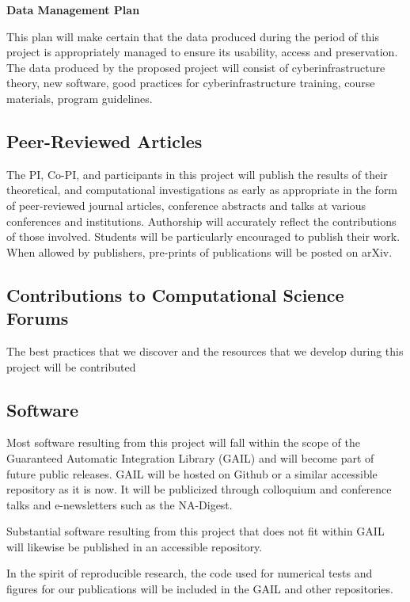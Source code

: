 \documentclass[11pt]{NSFamsart}
\begin{document}

\centerline{\textbf{\Large Data Management Plan}}

\bigskip



This plan will make certain that the data produced during the period of this project is appropriately managed to ensure its usability, access and preservation.  The data produced by the proposed project will consist of cyberinfrastructure theory, new software, good practices for cyberinfrastructure training, course materials, program guidelines. 

\subsection*{Peer-Reviewed Articles}  The PI, Co-PI, and participants in this project will publish the results of their theoretical, and computational investigations as early as appropriate in the form of peer-reviewed journal articles, conference abstracts and talks at various conferences and institutions. Authorship will accurately 
reflect the contributions of those involved.  Students will be particularly encouraged to publish their work. When allowed by publishers, pre-prints of publications will be posted on arXiv.

\subsection*{Contributions to Computational Science Forums} The best practices that we discover and the resources that we develop during this project will be contributed 

\subsection*{Software}
Most software resulting from this project will fall within the scope of the Guaranteed Automatic 
Integration Library (GAIL) and will become part of future public releases.  GAIL will be hosted on 
Github or a similar accessible repository as it is now.  It will be publicized through colloquium and 
conference talks and e-newsletters such as the NA-Digest.

Substantial software resulting from this project that does not fit within GAIL will likewise be 
published in an accessible repository.

In the spirit of reproducible research, the code used for numerical tests and figures for our 
publications will be included in the GAIL and other repositories.
\end{document}
